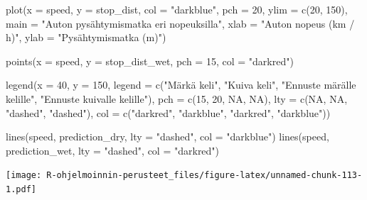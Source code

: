 \documentclass[
]{book}
\newenvironment{Shaded}{\begin{snugshade}}{\end{snugshade}}
\newcommand{\AttributeTok}[1]{\textcolor[rgb]{0.77,0.63,0.00}{#1}}
\newcommand{\ConstantTok}[1]{\textcolor[rgb]{0.00,0.00,0.00}{#1}}
\newcommand{\DecValTok}[1]{\textcolor[rgb]{0.00,0.00,0.81}{#1}}
\newcommand{\FunctionTok}[1]{\textcolor[rgb]{0.00,0.00,0.00}{#1}}
\newcommand{\NormalTok}[1]{#1}
\newcommand{\StringTok}[1]{\textcolor[rgb]{0.31,0.60,0.02}{#1}}
\begin{document}
\begin{Shaded}
\begin{Highlighting}[]
\FunctionTok{plot}\NormalTok{(}\AttributeTok{x =}\NormalTok{ speed, }\AttributeTok{y =}\NormalTok{ stop\_dist,}
     \AttributeTok{col =} \StringTok{"darkblue"}\NormalTok{, }\AttributeTok{pch =} \DecValTok{20}\NormalTok{,}
     \AttributeTok{ylim =} \FunctionTok{c}\NormalTok{(}\DecValTok{20}\NormalTok{, }\DecValTok{150}\NormalTok{),}
     \AttributeTok{main =} \StringTok{"Auton pysähtymismatka eri nopeuksilla"}\NormalTok{,}
     \AttributeTok{xlab =} \StringTok{"Auton nopeus (km / h)"}\NormalTok{, }\AttributeTok{ylab =} \StringTok{"Pysähtymismatka (m)"}\NormalTok{)}

\FunctionTok{points}\NormalTok{(}\AttributeTok{x =}\NormalTok{ speed, }\AttributeTok{y =}\NormalTok{ stop\_dist\_wet, }\AttributeTok{pch =} \DecValTok{15}\NormalTok{, }\AttributeTok{col =} \StringTok{"darkred"}\NormalTok{)}

\FunctionTok{legend}\NormalTok{(}\AttributeTok{x =} \DecValTok{40}\NormalTok{, }\AttributeTok{y =} \DecValTok{150}\NormalTok{,}
       \AttributeTok{legend =} \FunctionTok{c}\NormalTok{(}\StringTok{"Märkä keli"}\NormalTok{, }\StringTok{"Kuiva keli"}\NormalTok{,}
                  \StringTok{"Ennuste märälle kelille"}\NormalTok{,}
                  \StringTok{"Ennuste kuivalle kelille"}\NormalTok{),}
       \AttributeTok{pch =} \FunctionTok{c}\NormalTok{(}\DecValTok{15}\NormalTok{, }\DecValTok{20}\NormalTok{, }\ConstantTok{NA}\NormalTok{, }\ConstantTok{NA}\NormalTok{),}
       \AttributeTok{lty =} \FunctionTok{c}\NormalTok{(}\ConstantTok{NA}\NormalTok{, }\ConstantTok{NA}\NormalTok{, }\StringTok{"dashed"}\NormalTok{, }\StringTok{"dashed"}\NormalTok{),}
       \AttributeTok{col =} \FunctionTok{c}\NormalTok{(}\StringTok{"darkred"}\NormalTok{, }\StringTok{"darkblue"}\NormalTok{, }\StringTok{"darkred"}\NormalTok{, }\StringTok{"darkblue"}\NormalTok{))}

\FunctionTok{lines}\NormalTok{(speed, prediction\_dry, }\AttributeTok{lty =} \StringTok{"dashed"}\NormalTok{, }\AttributeTok{col =} \StringTok{"darkblue"}\NormalTok{)}
\FunctionTok{lines}\NormalTok{(speed, prediction\_wet, }\AttributeTok{lty =} \StringTok{"dashed"}\NormalTok{, }\AttributeTok{col =} \StringTok{"darkred"}\NormalTok{)}
\end{Highlighting}
\end{Shaded}

\texttt{[image: R-ohjelmoinnin-perusteet\_files/figure-latex/unnamed-chunk-113-1.pdf]}
\end{document}
